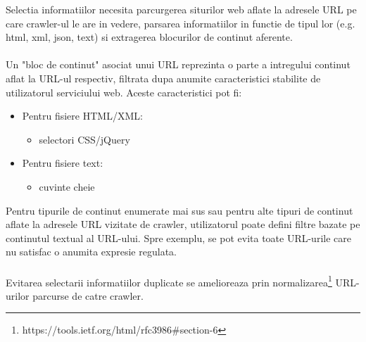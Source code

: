 \newcommand{\mimeDescription}{https://www.iana.org/assignments/media-types/media-types.xhtml}
\newcommand{\urlNormalization}{https://tools.ietf.org/html/rfc3986\#section-6}

Selectia informatiilor necesita parcurgerea siturilor web aflate la adresele URL pe care crawler-ul le are in vedere, parsarea informatiilor in functie de tipul lor (e.g. html, xml, json, text) si extragerea blocurilor de continut aferente.
\\
\\
Un "bloc de continut" asociat unui URL reprezinta o parte a intregului continut aflat la URL-ul respectiv, filtrata dupa anumite caracteristici stabilite de utilizatorul serviciului web. Aceste caracteristici pot fi:

\begin{itemize}
	\item{Pentru fisiere HTML/XML:
		\begin{itemize}
			\item{selectori CSS/jQuery}
		\end{itemize}			
	}
	\item{Pentru fisiere text:
		\begin{itemize}
			\item{cuvinte cheie}
		\end{itemize}			
	}
\end{itemize}

\noindent
Pentru tipurile de continut enumerate mai sus sau pentru alte tipuri de continut aflate la adresele URL vizitate de crawler, utilizatorul poate defini filtre bazate pe continutul textual al URL-ului. Spre exemplu, se pot evita toate URL-urile care nu satisfac o anumita expresie regulata. %
\\
\\
Evitarea selectarii informatiilor duplicate se amelioreaza prin normalizarea\footnote{\urlNormalization} URL-urilor parcurse de catre crawler.
